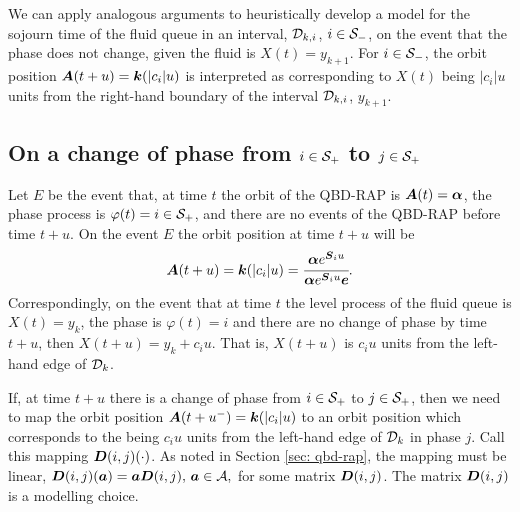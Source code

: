 We can apply analogous arguments to heuristically develop a model for the sojourn time of the fluid queue in an interval, \(\mathcal{D}_{k,i}\), \(i\in\mathcal{S}_-\), on the event that the phase does not change, given the fluid is \(X(t)=y_{k+1}\). For \(i\in\mathcal{S}_-\), the orbit position \(\boldsymbol A(t+u) = \boldsymbol k(|c_i|u)\) is interpreted as corresponding to \(X(t)\) being \(|c_i|u\) units from the right-hand boundary of the interval \(\mathcal{D}_{k,i}\), \(y_{k+1}\). 

\subsection{On a change of phase from \(i\in\mathcal{S}_+\) to \(j\in\mathcal{S}_+\)} 

Let \(E\) be the event that, at time \(t\) the orbit of the QBD-RAP is \(\boldsymbol A(t) = \boldsymbol \alpha\), the phase process is \(\varphi(t) = i\in\mathcal{S}_+\), and there are no events of the QBD-RAP before time \(t+u\). On the event \(E\) the orbit position at time \(t+u\) will be 
\begin{align}
	\boldsymbol A(t+u) = \boldsymbol k(|c_i|u) = \cfrac{\boldsymbol \alpha e^{\boldsymbol S_i u}}{\boldsymbol \alpha e^{\boldsymbol S_i u}\boldsymbol e}.\label{eqn: orbit i}
\end{align}
Correspondingly, on the event that at time \(t\) the level process of the fluid queue is \(X(t)=y_{k}\), the phase is \(\varphi(t)=i\) and there are no change of phase by time \(t+u\), then \(X(t+u)=y_{k}+c_iu\). That is, \(X(t+u)\) is \(c_iu\) units from the left-hand edge of \(\mathcal{D}_k\). 

If, at time \(t+u\) there is a change of phase from \(i\in\mathcal{S}_+\) to \(j\in\mathcal{S}_+\), then we need to map the orbit position \(\boldsymbol A(t+u^-) = \boldsymbol k(|c_i|u)\) to an orbit position which corresponds to the being \(c_iu\) units from the left-hand edge of \(\mathcal{D}_k\) in phase \(j\). Call this mapping \(\boldsymbol D(i,j)(\cdot)\). As noted in Section \ref{sec: qbd-rap}, the mapping must be linear, 
\(\boldsymbol D(i,j)(\boldsymbol a) = \boldsymbol a \boldsymbol D(i,j),\, \boldsymbol a \in\mathcal A,\)
for some matrix \(\boldsymbol D(i,j)\). The matrix \(\boldsymbol D(i,j)\) is a modelling choice. 

